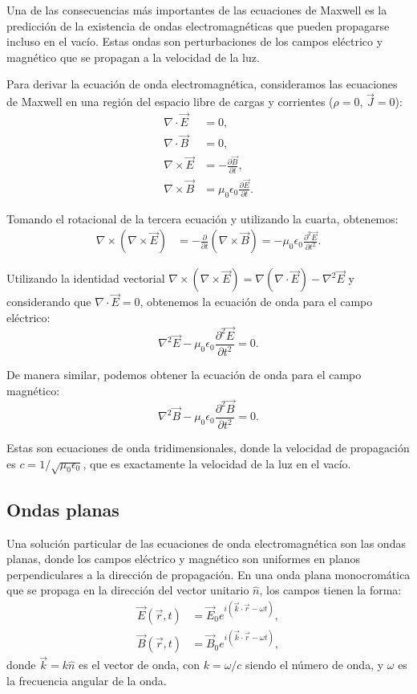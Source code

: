 \documentclass[12pt,a4paper]{book}
\begin{document}
Una de las consecuencias más importantes de las ecuaciones de Maxwell es la predicción de la existencia de ondas electromagnéticas que pueden propagarse incluso en el vacío. Estas ondas son perturbaciones de los campos eléctrico y magnético que se propagan a la velocidad de la luz.

Para derivar la ecuación de onda electromagnética, consideramos las ecuaciones de Maxwell en una región del espacio libre de cargas y corrientes ($\rho = 0$, $\vec{J} = 0$):
\begin{align}
\nabla \cdot \vec{E} &= 0, \\
\nabla \cdot \vec{B} &= 0, \\
\nabla \times \vec{E} &= -\frac{\partial \vec{B}}{\partial t}, \\
\nabla \times \vec{B} &= \mu_0 \epsilon_0 \frac{\partial \vec{E}}{\partial t}.
\end{align}

Tomando el rotacional de la tercera ecuación y utilizando la cuarta, obtenemos:
\begin{align}
\nabla \times (\nabla \times \vec{E}) &= -\frac{\partial}{\partial t}(\nabla \times \vec{B}) = -\mu_0 \epsilon_0 \frac{\partial^2 \vec{E}}{\partial t^2}.
\end{align}

Utilizando la identidad vectorial $\nabla \times (\nabla \times \vec{E}) = \nabla(\nabla \cdot \vec{E}) - \nabla^2\vec{E}$ y considerando que $\nabla \cdot \vec{E} = 0$, obtenemos la ecuación de onda para el campo eléctrico:
\begin{equation}
\nabla^2\vec{E} - \mu_0 \epsilon_0 \frac{\partial^2 \vec{E}}{\partial t^2} = 0.
\end{equation}

De manera similar, podemos obtener la ecuación de onda para el campo magnético:
\begin{equation}
\nabla^2\vec{B} - \mu_0 \epsilon_0 \frac{\partial^2 \vec{B}}{\partial t^2} = 0.
\end{equation}

Estas son ecuaciones de onda tridimensionales, donde la velocidad de propagación es $c = 1/\sqrt{\mu_0 \epsilon_0}$, que es exactamente la velocidad de la luz en el vacío.

\subsection{Ondas planas}

Una solución particular de las ecuaciones de onda electromagnética son las ondas planas, donde los campos eléctrico y magnético son uniformes en planos perpendiculares a la dirección de propagación. En una onda plana monocromática que se propaga en la dirección del vector unitario $\hat{n}$, los campos tienen la forma:
\begin{align}
\vec{E}(\vec{r}, t) &= \vec{E}_0 e^{i(\vec{k} \cdot \vec{r} - \omega t)}, \\
\vec{B}(\vec{r}, t) &= \vec{B}_0 e^{i(\vec{k} \cdot \vec{r} - \omega t)},
\end{align}
donde $\vec{k} = k\hat{n}$ es el vector de onda, con $k = \omega/c$ siendo el número de onda, y $\omega$ es la frecuencia angular de la onda.
\end{document}
